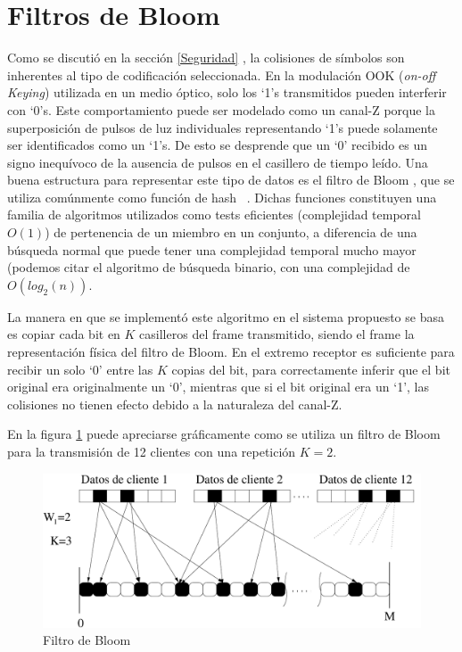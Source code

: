 \section{Filtros de Bloom}
\label{Bloomf}
Como se discutió en la sección \ref{Seguridad} , la colisiones de símbolos son inherentes al tipo de codificación seleccionada.
En la modulación OOK (\textit{on-off Keying}) utilizada en un medio óptico, solo los ‘1’s transmitidos pueden interferir con ‘0’s. Este comportamiento puede ser modelado como un canal-Z porque la superposición de pulsos de luz individuales representando ‘1’s puede solamente ser identificados como un ‘1’s. De esto se desprende que un ‘0’ recibido es un signo inequívoco de la ausencia de pulsos en el casillero de tiempo leído.
Una buena estructura para representar este tipo de datos es el filtro de Bloom \cite{Bloom70space/timetrade-offs}, que se utiliza comúnmente como función de hash~ \cite{song2005fast}. Dichas funciones constituyen una familia de algoritmos utilizados como tests eficientes (complejidad temporal $O(1)$) de pertenencia de un miembro en un conjunto, a diferencia de una búsqueda normal que puede tener una complejidad temporal mucho mayor (podemos citar el algoritmo de búsqueda binario, con una complejidad de $O(log_2(n))$.

La manera en que se implementó este algoritmo en el sistema propuesto se basa es copiar cada bit en $K$ casilleros del frame transmitido, siendo el frame la representación física del filtro de Bloom.
En el extremo receptor es suficiente para recibir un solo ‘0’ entre las $K$ copias del bit, para correctamente inferir que el bit original era originalmente un ‘0’, mientras que si el bit original era un ‘1’, las colisiones no tienen efecto debido a la naturaleza del canal-Z.

En la figura \ref{fig:Bloomf} puede apreciarse gráficamente como se utiliza un filtro de Bloom para la transmisión de 12 clientes con una repetición $K=2$. 

\begin{figure}[th]
  \begin{center}
    \includegraphics[scale=0.5]{graphs/frame-sp}
  \end{center}
  \caption{Filtro de Bloom}
  \label{fig:Bloomf}
\end{figure}

